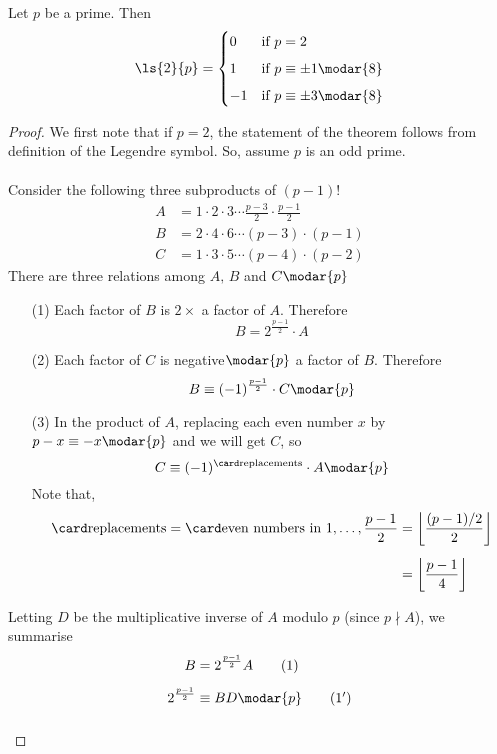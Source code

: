 \vspace*{1em}

\begin{theorem}
Let $p$ be a prime. Then
\[\ls{2}{p} = \begin{cases}0 & \text{if $p = 2$}\\[0.5em] 1 & \text{if $p\equiv \pm 1 \modar{8}$}\\[0.5em] -1 & \text{if $p\equiv \pm 3\modar{8}$} \end{cases}\]
\end{theorem}
\begin{proof}
We first note that if $p = 2$, the statement of the theorem follows from definition of the Legendre symbol. So, assume $p$ is an odd prime.\\
\\
Consider the following three subproducts of $(p-1)!$
\begin{align*}
A &= 1\cdot 2\cdot 3\cdots \frac{p-3}{2}\cdot \frac{p-1}{2}\\[0.5em]
B &= 2\cdot 4\cdot 6\cdots (p-3)\cdot (p-1)\\[0.5em]
C &= 1\cdot 3\cdot 5\cdots (p-4)\cdot (p-2)
\end{align*}
There are three relations among $A,\,B$ and $C \modar{p}$
\begin{itemize}
\item[(1)] Each factor of $B$ is $2\times$ a factor of $A$. Therefore
\[B = 2^{\frac{p-1}{2}}\cdot A\]
\item[(2)] Each factor of $C$ is negative$\modar{p}$ a factor of $B$. Therefore
\[B \equiv (-1)^{\frac{p-1}{2}}\cdot C\modar{p}\]
\item[(3)] In the product of $A$, replacing each even number $x$ by $p - x \equiv -x \modar{p}$ and we will get $C$, so
\[C \equiv (-1)^{\card\text{replacements}}\cdot A\modar{p}\]
Note that,
\begin{align*}
\card\text{replacements} = \card\text{even numbers in } 1,\ldots,\frac{p-1}{2} &= \left\lfloor \frac{(p-1)/2}{2}\right\rfloor\\[0.5em]
&= \left\lfloor \frac{p-1}{4}\right\rfloor
\end{align*}
\end{itemize}
Letting $D$ be the multiplicative inverse of $A$ modulo $p$ (since $p\nmid A$), we summarise
\begin{align*}
B &= 2^{\frac{p-1}{2}} A \label{qr21}\tag{$1$}\\[0.5em]
2^{\frac{p-1}{2}} &\equiv BD \modar{p} \label{qr211}\tag{$1'$}\\[1em]

\end{align*}
\end{proof}
